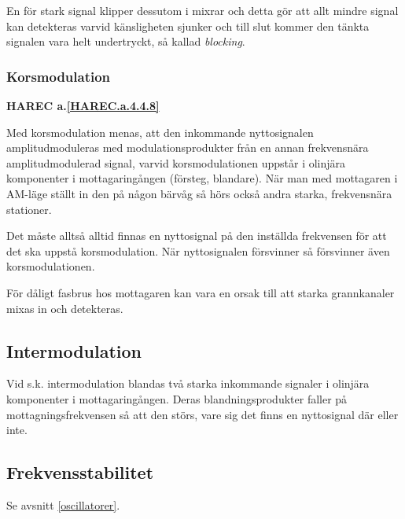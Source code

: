 En för stark signal klipper dessutom i mixrar och detta gör att allt mindre
signal kan detekteras varvid känsligheten sjunker och till slut kommer den
tänkta signalen vara helt undertryckt, så kallad \emph{blocking}.

\subsubsection{Korsmodulation}
\textbf{HAREC
  a.\ref{HAREC.a.4.4.8}\label{myHAREC.a.4.4.8}
}

Med korsmodulation menas, att den inkommande nyttosignalen
amplitudmoduleras med modulationsprodukter från en annan frekvensnära
amplitudmodulerad signal, varvid korsmodulationen uppstår i olinjära
komponenter i mottagaringången (försteg, blandare). När man med
mottagaren i AM-läge ställt in den på någon bärvåg så hörs också andra
starka, frekvensnära stationer.

Det måste alltså alltid finnas en nyttosignal på den inställda
frekvensen för att det ska uppstå korsmodulation. När nyttosignalen
försvinner så försvinner även korsmodulationen.

För dåligt fasbrus hos mottagaren kan vara en orsak till att starka
grannkanaler mixas in och detekteras.

\subsection{Intermodulation}

Vid s.k. intermodulation blandas två starka inkommande signaler i
olinjära komponenter i mottagaringången. Deras blandningsprodukter
faller på mottagningsfrekvensen så att den störs, vare sig det finns
en nyttosignal där eller inte.

\subsection{Frekvensstabilitet}

Se avsnitt \ref{oscillatorer}.
